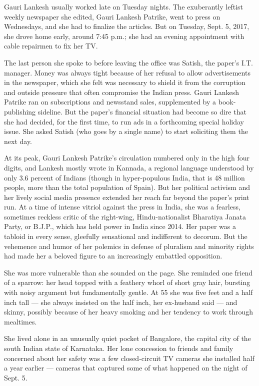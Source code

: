 Gauri Lankesh usually worked late on Tuesday nights. The exuberantly
leftist weekly newspaper she edited, Gauri Lankesh Patrike, went to
press on Wednesdays, and she had to finalize the articles. But on
Tuesday, Sept. 5, 2017, she drove home early, around 7:45 p.m.; she had
an evening appointment with cable repairmen to fix her TV.

The last person she spoke to before leaving the office was Satish, the
paper's I.T. manager. Money was always tight because of her refusal to
allow advertisements in the newspaper, which she felt was necessary to
shield it from the corruption and outside pressure that often compromise
the Indian press. Gauri Lankesh Patrike ran on subscriptions and
newsstand sales, supplemented by a book-publishing sideline. But the
paper's financial situation had become so dire that she had decided, for
the first time, to run ads in a forthcoming special holiday issue. She
asked Satish (who goes by a single name) to start soliciting them the
next day.

At its peak, Gauri Lankesh Patrike's circulation numbered only in the
high four digits, and Lankesh mostly wrote in Kannada, a regional
language understood by only 3.6 percent of Indians (though in
hyper-populous India, that is 48 million people, more than the total
population of Spain). But her political activism and her lively social
media presence extended her reach far beyond the paper's print run. At a
time of intense vitriol against the press in India, she was a fearless,
sometimes reckless critic of the right-wing, Hindu-nationalist Bharatiya
Janata Party, or B.J.P., which has held power in India since 2014. Her
paper was a tabloid in every sense, gleefully sensational and
indifferent to decorum. But the vehemence and humor of her polemics in
defense of pluralism and minority rights had made her a beloved figure
to an increasingly embattled opposition.

She was more vulnerable than she sounded on the page. She reminded one
friend of a sparrow: her head topped with a feathery whorl of short gray
hair, bursting with noisy argument but fundamentally gentle. At 55 she
was five feet and a half inch tall --- she always insisted on the half
inch, her ex-husband said --- and skinny, possibly because of her heavy
smoking and her tendency to work through mealtimes.

She lived alone in an unusually quiet pocket of Bangalore, the capital
city of the south Indian state of Karnataka. Her lone concession to
friends and family concerned about her safety was a few closed-circuit
TV cameras she installed half a year earlier --- cameras that captured
some of what happened on the night of Sept. 5.

